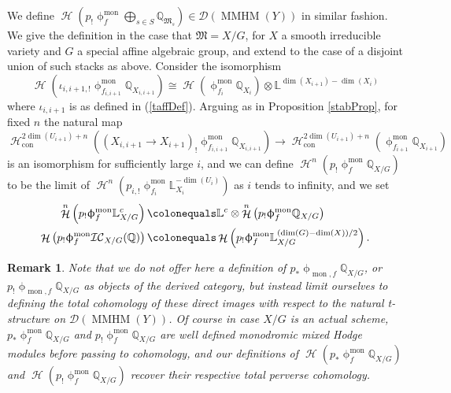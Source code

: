 \documentclass[a4paper,10pt]{amsart}
\renewcommand{\phi}{\upphi}
\newtheorem{remark}[theorem]{Remark}
\newcommand{\LL}{\mathbb{L}}
\newcommand{\QQ}{\mathbb{Q}}
\newcommand{\Mst}{\mathfrak{M}}
\newcommand{\ICS}{\mathcal{IC}}
\newcommand{\phim}[1]{\phi^{\mon}_{#1}}
\DeclareMathOperator{\mon}{mon}
\DeclareMathOperator{\MMHM}{MMHM}
\DeclareMathOperator{\con}{con}
\DeclareMathOperator{\Ho}{\mathcal{H}}
\newcommand{\Dub}{\mathcal{D}}
\begin{document}
We define $\Ho\left(p_!\phim{f}\bigoplus_{s\in S}\mathbb{Q}_{\Mst_s}\right)\in \Dub(\MMHM(Y))$ in similar fashion.  We give the definition in the case that $\Mst=X/G$, for $X$ a smooth irreducible variety and $G$ a special affine algebraic group, and extend to the case of a disjoint union of such stacks as above. 
\smallbreak
Consider the isomorphism \[\Ho(\iota_{i,i+1,!}\phim{f_{i,i+1}}\mathbb{Q}_{X_{i,i+1}})\cong \Ho(\phim{f_{i}}\mathbb{Q}_{X_{i}})\otimes\mathbb{L}^{\dim(X_{i+1})-\dim(X_i)}\] where $\iota_{i,i+1}$ is as defined in (\ref{taffDef}).  Arguing as in Proposition \ref{stabProp}, for fixed $n$ the natural map 
\[
\Ho_{\con}^{2\dim(U_{i+1})+n}((X_{i,i+1}\rightarrow X_{i+1})_!\phim{f_{i,i+1}}\mathbb{Q}_{X_{i,i+1}})\rightarrow \Ho_{\con}^{2\dim(U_{i+1})+n}(\phim{f_{i+1}}\mathbb{Q}_{X_{i+1}})
\]
is an isomorphism for sufficiently large $i$, and we can define $\Ho^n\left(p_!\phim{f}\mathbb{Q}_{X/G}\right)$ to be the limit of $\Ho^n\left(p_{i,!}\phim{f_i}\mathbb{L}_{X_i}^{-\dim(U_i)}\right)$ as $i$ tends to infinity, and we set
\begin{align*}
\Ho^n\left(p_!\phim{f}\mathbb{L}^c_{X/G}\right)\colonequals &\LL^c\otimes\Ho^n\left(p_!\phim{f}\QQ_{X/G}\right)\\
\Ho\left(p_!\phim{f}\ICS_{X/G}(\mathbb{Q})\right)\colonequals &\Ho\left(p_!\phim{f}\LL^{(\dim(G)-\dim(X))/2}_{X/G}\right).
\end{align*}


\begin{remark}
Note that we do not offer here a definition of $p_*\phi_{\mon,f}\mathbb{Q}_{X/G}$, or $p_!\phi_{\mon,f}\mathbb{Q}_{X/G}$ as objects of the derived category, but instead limit ourselves to defining the total cohomology of these direct images with respect to the natural t-structure on $\Dub(\MMHM(Y))$.  Of course in case $X/G$ is an actual scheme, $p_*\phi^{\mon}_{f}\mathbb{Q}_{X/G}$ and $p_!\phi^{\mon}_{f}\mathbb{Q}_{X/G}$ are well defined monodromic mixed Hodge modules before passing to cohomology, and our definitions of $\Ho\left(p_*\phim{f}\mathbb{Q}_{X/G}\right)$ and $\Ho\left(p_!\phim{f}\mathbb{Q}_{X/G}\right)$ recover their respective total perverse cohomology.
\end{remark}
\end{document}
